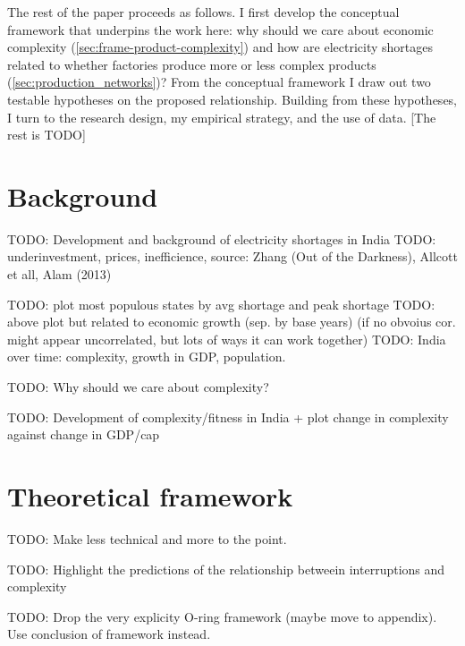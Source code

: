 \documentclass[11pt]{article}
\begin{document}
The rest of the paper proceeds as follows. I first develop the conceptual framework that underpins the work here: why should we care about economic complexity (\ref{sec:frame-product-complexity}) and how are electricity shortages related to whether factories produce more or less complex products (\ref{sec:production_networks})? From the conceptual framework I draw out two testable hypotheses on the proposed relationship. Building from these hypotheses, I turn to the research design, my empirical strategy, and the use of data. [The rest is TODO]

\newpage
\section{Background}%
\label{sec:background}

TODO: Development and background of electricity shortages in India
TODO: underinvestment, prices, inefficience, source: Zhang (Out of the Darkness), Allcott et all, Alam (2013)

TODO: plot most populous states by avg shortage and peak shortage
TODO: above plot but related to economic growth (sep. by base years) (if no obvoius cor. might appear uncorrelated, but lots of ways it can work together)
TODO: India over time: complexity, growth in GDP, population.

TODO: Why should we care about complexity?

TODO: Development of complexity/fitness in India + plot change in complexity against change in GDP/cap



\section{Theoretical framework}%
\label{sec:framework}

TODO: Make less technical and more to the point.

TODO: Highlight the predictions of the relationship betweein interruptions and complexity

TODO: Drop the very explicity O-ring framework (maybe move to appendix). Use conclusion of framework instead.
\end{document}
